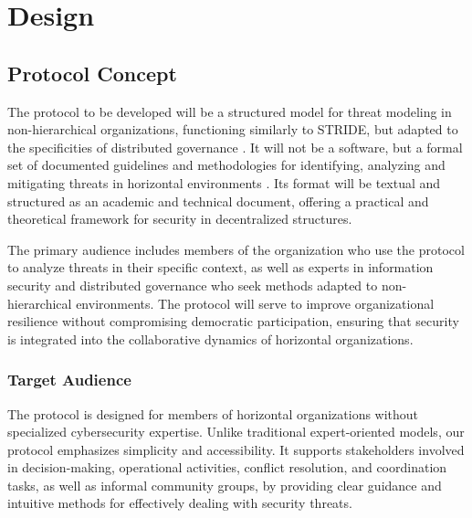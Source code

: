 
%

\chapter{Design}
\label{cha:design}

\glsresetall
 
\section{Protocol Concept}
\label{sec:protocol_concept}

The protocol to be developed will be a structured model for threat modeling in
non-hierarchical organizations, functioning similarly to STRIDE, but adapted to
the specificities of distributed governance
\cite{ThreatModelingdesigningForSecurity}. It will not be a software, but a
formal set of documented guidelines and methodologies for identifying, analyzing
and mitigating threats in horizontal environments \cite{Colbac}. Its format will
be textual and structured as an academic and technical document, offering a
practical and theoretical framework for security in decentralized structures.

The primary audience includes members of the organization who use the protocol
to analyze threats in their specific context, as well as experts in information
security and distributed governance who seek methods adapted to non-hierarchical
environments. The protocol will serve to improve organizational resilience
without compromising democratic participation, ensuring that security is
integrated into the collaborative dynamics of horizontal organizations.

\subsection{Target Audience}
\label{subsec:target_audience}

The protocol is designed for members of horizontal organizations without
specialized cybersecurity expertise. Unlike traditional expert-oriented models,
our protocol emphasizes simplicity and accessibility. It supports stakeholders
involved in decision-making, operational activities, conflict resolution, and
coordination tasks, as well as informal community groups, by providing clear
guidance and intuitive methods for effectively dealing with security threats.

